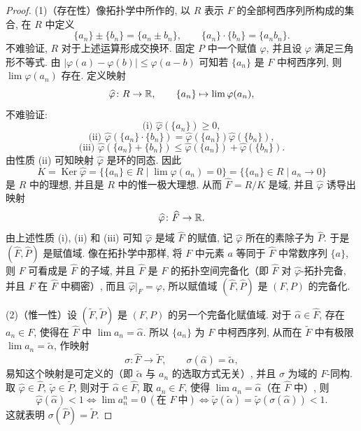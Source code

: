 \begin{proof}
(1)（存在性）像拓扑学中所作的, 以 $R$ 表示 $F$ 的全部柯西序列所构成的集合, 在 $R$ 中定义
\[
  \{a_n\}\pm\{b_n\}=\{a_n\pm b_n\},\qquad\{a_n\}\cdot\{b_n\}=\{a_nb_n\}.
\]
不难验证, $R$ 对于上述运算形成交换环. 固定 $P$ 中一个赋值 $\varphi$, 并且设 $\varphi$ 满足三角形不等式. 由 $|\varphi(a)-\varphi(b)|\leqslant\varphi(a-b)$ 可知若 $\{a_n\}$ 是 $F$ 中柯西序列, 则 $\lim\varphi(a_n)$ 存在. 定义映射
\[
  \widehat{\varphi}\colon R\to\mathbb{R},\qquad\{a_n\}\mapsto\lim\varphi(a_n),
\]
不难验证:
\[
  \text{(i) } \widehat{\varphi}(\{a_n\})\geqslant 0,
\]
\[
  \text{(ii) } \widehat{\varphi}(\{a_n\}\cdot\{b_n\})=\widehat{\varphi}(\{a_n\})\widehat{\varphi}(\{b_n\}),
\]
\[
  \text{(iii) } \widehat{\varphi}(\{a_n\}+\{b_n\})\leqslant\widehat{\varphi}(\{a_n\})+\widehat{\varphi}(\{b_n\}).
\]
由性质 (ii) 可知映射 $\widehat{\varphi}$ 是环的同态. 因此
\[
  K=\operatorname{Ker}\widehat{\varphi}
  =\{\{a_n\}\in R\mid\lim\varphi(a_n)=0\}
  =\{\{a_n\}\in R\mid a_n\to 0\}
\]
是 $R$ 中的理想, 并且是 $R$ 中的惟一极大理想. 从而 $\widehat{F}=R/K$ 是域, 并且 $\widehat{\varphi}$ 诱导出映射
\[
  \widehat{\varphi}\colon\widehat{F}\to\mathbb{R}.
\]
由上述性质 (i), (ii) 和 (iii) 可知 $\widehat{\varphi}$ 是域 $\widehat{F}$ 的赋值, 记 $\widehat{\varphi}$ 所在的素除子为 $\widehat{P}$. 于是 $(\widehat{F},\widehat{P})$ 是赋值域. 像在拓扑学中那样, 将 $F$ 中元素 $a$ 等同于 $\widehat{F}$ 中常数序列 $\{a\}$, 则 $F$ 可看成是 $\widehat{F}$ 的子域, 并且 $\widehat{F}$ 是 $F$ 的拓扑空间完备化（即 $\widehat{F}$ 对 $\widehat{\varphi}$-拓扑完备, 并且 $F$ 在 $\widehat{F}$ 中稠密）, 而且 $\widehat{\varphi}|_F=\varphi$, 所以赋值域 $(\widehat{F},\widehat{P})$ 是 $(F,P)$ 的完备化.

(2)（惟一性）设 $(\widetilde{F},\widetilde{P})$ 是 $(F,P)$ 的另一个完备化赋值域. 对于 $\hat{\alpha}\in\widehat{F}$, 存在 $a_n\in F$, 使得在 $\widehat{F}$ 中 $\lim a_n=\hat{\alpha}$. 所以 $\{a_n\}$ 为 $F$ 中柯西序列, 从而在 $\widetilde{F}$ 中有极限 $\lim a_n=\tilde{\alpha}$, 作映射
\[
  \sigma\colon\widehat{F}\to\widetilde{F},\qquad\sigma(\hat{\alpha})=\tilde{\alpha},
\]
易知这个映射是可定义的（即 $\tilde{\alpha}$ 与 $a_n$ 的选取方式无关）, 并且 $\sigma$ 为域的 $F$-同构. 取 $\widehat{\varphi}\in\widehat{P}$, $\widetilde{\varphi}\in\widetilde{P}$, 则对于 $\hat{\alpha}\in\widehat{F}$, 取 $a_n\in F$, 使得 $\lim a_n=\hat{\alpha}$（在 $\widehat{F}$ 中）, 则
\[
  \widehat{\varphi}(\hat{\alpha})<1\Leftrightarrow\lim a_n^n=0\ (\text{在 } F\ \text{中})\Leftrightarrow\widetilde{\varphi}(\tilde{\alpha})=\widetilde{\varphi}(\sigma(\hat{\alpha}))<1.
\]
这就表明 $\sigma(\widehat{P})=\widetilde{P}$.
\end{proof}

